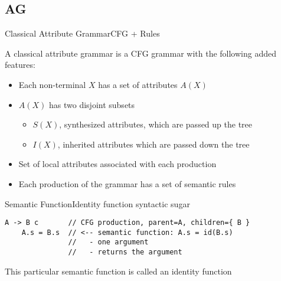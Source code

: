 \subsection*{AG}{}

\begin{frame}{Classical Attribute Grammar}{CFG + Rules}


A classical attribute grammar is a \alert{CFG grammar} with the following added features:

\begin{itemize}
    \item Each non-terminal $X$ has a set of attributes $A(X)$
    \item $A(X)$ has two disjoint subsets
    \begin{itemize}
        \item $S(X)$, synthesized attributes, which are passed up the tree
        \item $I(X)$, inherited attributes which are passed down the tree
    \end{itemize}
    \item Set of local attributes associated with each production
    \item Each production of the grammar has a set of \alert{semantic rules}
\end{itemize}

\end{frame}






\begin{frame}[fragile=singleslide]{Semantic Function}{Identity function syntactic sugar}

\begin{verbatim}
A -> B c       // CFG production, parent=A, children={ B }
    A.s = B.s  // <-- semantic function: A.s = id(B.s)
               //   - one argument
               //   - returns the argument
\end{verbatim}

This particular semantic function is called an \alert{identity function}

\end{frame}

